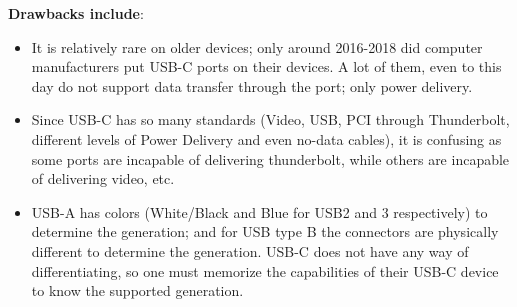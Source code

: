 \documentclass[../main.tex]{subfiles}
\begin{document}
\textbf{Drawbacks include}:
\begin{itemize}
    \item It is relatively rare on older devices; only around 2016-2018 did computer manufacturers put USB-C ports on their devices. A lot of them, even to this day do not support data transfer through the port; only power delivery.
    \item Since USB-C has so many standards (Video, USB, PCI through Thunderbolt, different levels of Power Delivery and even no-data cables), it is confusing as some ports are incapable of delivering thunderbolt, while others are incapable of delivering video, etc.
    \item USB-A has colors (White/Black and Blue for USB2 and 3 respectively) to determine the generation; and for USB type B the connectors are physically different to determine the generation. USB-C does not have any way of differentiating, so one must memorize the capabilities of their USB-C device to know the supported generation.
\end{itemize}
\end{document}
